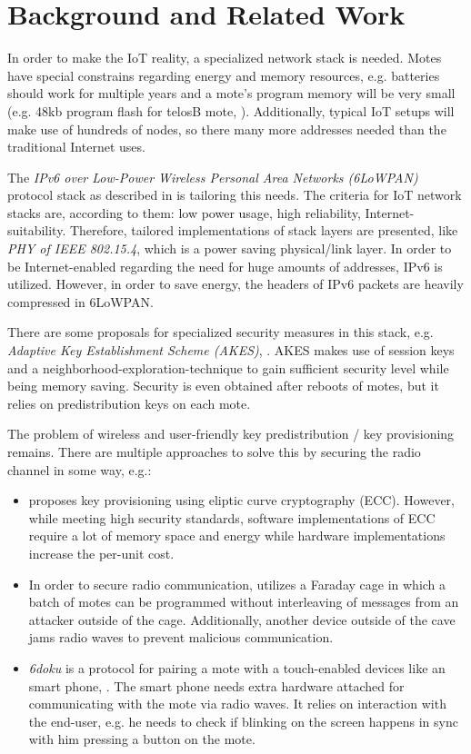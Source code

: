 \documentclass{sig-alternate} %
\begin{document}
\section{Background and Related Work}
\label{sec:related_work}

In order to make the IoT reality, a specialized network stack is needed.
Motes have special constrains regarding energy and memory resources, e.g. batteries should work for multiple years and a mote's program memory will be very small (e.g. 48kb program flash for telosB mote, \cite{telosb}).
Additionally, typical IoT setups will make use of hundreds of nodes, so there many more addresses needed than the traditional Internet uses.

The \textit{IPv6 over Low-Power Wireless Personal Area Networks (6LoWPAN)} protocol stack as described in \cite{palattella2013standardized} is tailoring this needs.
The criteria for IoT network stacks are, according to them: low power usage, high reliability, Internet-suitability.
Therefore, tailored implementations of stack layers are presented, like \textit{PHY of IEEE 802.15.4}, which is a power saving physical/link layer.
In order to be Internet-enabled regarding the need for huge amounts of addresses, IPv6 is utilized.
However, in order to save energy, the headers of IPv6 packets are heavily compressed in 6LoWPAN.

There are some proposals for specialized security measures in this stack, e.g. \textit{Adaptive Key Establishment Scheme (AKES)}, \cite{krentz15akes}.
AKES makes use of session keys and a neighborhood-exploration-technique to gain sufficient security level while being memory saving.
Security is even obtained after reboots of motes, but it relies on predistribution keys on each mote.

The problem of wireless and user-friendly key predistribution / key provisioning remains.
There are multiple approaches to solve this by securing the radio channel in some way, e.g.:

\begin{itemize}
	\item \cite{chen2011over} proposes key provisioning using eliptic curve cryptography (ECC). However, while meeting high security standards, software implementations of ECC require a lot of memory space and energy while hardware implementations increase the per-unit cost.
	\item In order to secure radio communication, \cite{kuo2007message} utilizes a Faraday cage in which a batch of motes can be programmed without interleaving of messages from an attacker outside of the cage. Additionally, another device outside of the cave jams radio waves to prevent malicious communication.
	\item \textit{6doku} is a protocol for pairing  a mote with a touch-enabled devices like an smart phone, \cite{krentz20156doku}. The smart phone needs extra hardware attached for communicating with the mote via radio waves. It relies on interaction with the end-user, e.g. he needs to check if blinking on the screen happens in sync with him pressing a button on the mote.
\end{itemize}
\end{document}
